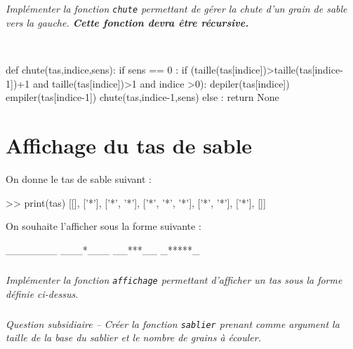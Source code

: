 \documentclass[10pt,fleqn]{article} %
\begin{document}
\subparagraph{}
\textit{Implémenter la fonction \texttt{chute} permettant de gérer la chute d'un grain de sable vers la gauche. \textbf{Cette fonction devra être récursive.}}
\ifprof
\begin{corrige}
~\\
\begin{python}
def chute(tas,indice,sens):
    if sens == 0 :
        if (taille(tas[indice])>taille(tas[indice-1])+1 and taille(tas[indice])>1 and indice >0):
            depiler(tas[indice])
            empiler(tas[indice-1])
            chute(tas,indice-1,sens)
        else :
            return None
\end{python}
\end{corrige}
\else
\fi

\section{Affichage du tas de sable}
\begin{minipage}[t]{.47\linewidth}
On donne le tas de sable suivant : 
\begin{py}
\begin{python}
>> print(tas)
    [[], ['*'], ['*', '*'], ['*', '*', '*'], 
    ['*', '*'], ['*'], []]
\end{python}
\end{py}
\end{minipage} \hfill
\begin{minipage}[t]{.47\linewidth}
On souhaite l'afficher sous la forme suivante : 
\begin{py}
\begin{python}
_______
___*___
__***__
_*****_
\end{python}
\end{py}
\end{minipage} 

\subparagraph{}
\textit{Implémenter la fonction \texttt{affichage} permettant d'afficher un tas sous la forme définie ci-dessus.}
\ifprof
\begin{corrige}

\end{corrige}
\else
\fi

\subparagraph{}
\textit{Question subsidiaire -- Créer la fonction \texttt{sablier} prenant comme argument la taille de la base du sablier et le nombre de grains à écouler.}
\ifprof
\begin{corrige}

\end{corrige}
\else
\fi

%
\end{document}
